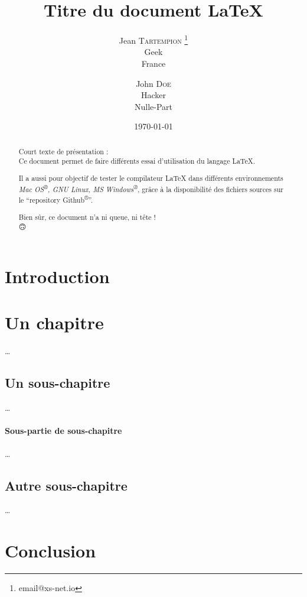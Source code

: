 \documentclass[frenchb, 12pt, twoside, a4paper]{article}
\title{Titre du document \LaTeX{}}
\author{
  Jean \textsc{Tartempion}
  \thanks{email@xs-net.io} \\
  Geek \\
  France
  \and
  John \textsc{Doe} \\
  Hacker \\
  Nulle-Part
  }
\date{\today}                           %
\begin{document}
\maketitle                              %

{
\renewcommand{\contentsname}{Sommaire}  %
\tableofcontents                        %
}


\begin{abstract}
  Court texte de présentation : \\
  Ce document permet de faire différents essai d'utilisation
  du langage \LaTeX{}.
  
  Il a aussi pour objectif de tester le compilateur \LaTeX{}
  dans différents environnements 
  \emph{Mac OS\textsuperscript{®}, GNU Linux, MS Windows\textsuperscript{®}},
  grâce à la disponibilité des fichiers sources sur le 
  \enquote{repository Github\textsuperscript{®}}.
  
  Bien sûr, ce document n'a ni queue, ni tête ! \\
  \Large{🙃}
\end{abstract}



\section*{Introduction}


\section{Un chapitre}
…

\subsection{Un sous-chapitre}
…
\paragraph{Sous-partie de sous-chapitre}
…

\subsection{Autre sous-chapitre}
…

\section*{Conclusion}

\end{document}
